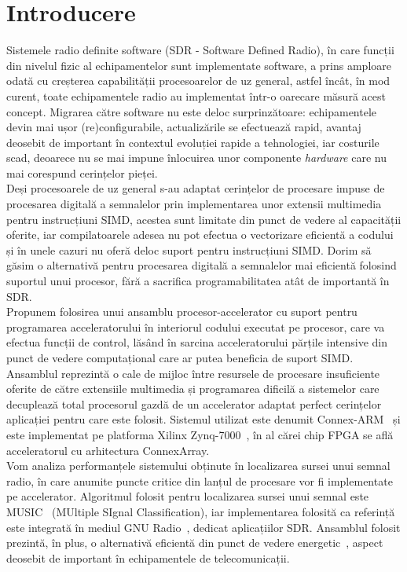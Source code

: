 \chapter{Introducere}
\label{chapter:intro}

Sistemele radio definite software (SDR - Software Defined Radio), în care
funcții din nivelul fizic al echipamentelor sunt implementate software, a prins
amploare odată cu creșterea capabilității procesoarelor de uz general, astfel
încât, în mod curent, toate echipamentele radio au implementat într-o oarecare
măsură acest concept. Migrarea către software nu este deloc surprinzătoare:
echipamentele devin mai ușor (re)configurabile, actualizările se efectuează rapid, avantaj
deosebit de important în contextul evoluției rapide a tehnologiei, iar costurile
scad, deoarece nu se mai impune înlocuirea unor componente \textit{hardware} care nu mai
corespund cerințelor pieței. \\

Deși procesoarele de uz general s-au adaptat cerințelor de procesare impuse de
procesarea digitală a semnalelor prin implementarea unor extensii multimedia
pentru instrucțiuni SIMD, acestea sunt limitate din punct de vedere al
capacității oferite, iar compilatoarele adesea nu pot efectua o vectorizare
eficientă a codului și în unele cazuri nu oferă deloc suport pentru instrucțiuni
SIMD. Dorim să găsim o alternativă pentru procesarea digitală a semnalelor mai
eficientă folosind suportul unui procesor, fără a sacrifica
programabilitatea atât de importantă în SDR. \\

Propunem folosirea unui ansamblu procesor-accelerator cu suport pentru
programarea acceleratorului în interiorul codului executat pe procesor, care va
efectua funcții de control, lăsând în sarcina acceleratorului părțile intensive
din punct de vedere computațional care ar putea beneficia de suport SIMD.
Ansamblul reprezintă o cale de mijloc între resursele de procesare insuficiente
oferite de către extensiile multimedia și programarea dificilă a sistemelor care
decuplează total procesorul gazdă de un accelerator adaptat perfect cerințelor
aplicației pentru care este folosit. Sistemul utilizat este denumit
Connex-ARM~\cite{energy-effective-simd} și este implementat pe platforma Xilinx
Zynq-7000~\cite{zynq}, în al cărei chip FPGA se află acceleratorul cu
arhitectura ConnexArray. \\

Vom analiza performanțele sistemului obținute în localizarea sursei unui semnal
radio, în care anumite puncte critice din lanțul de procesare vor fi
implementate pe accelerator. Algoritmul folosit pentru localizarea sursei unui
semnal este MUSIC~\cite{music-schmidt} (MUltiple SIgnal Classification), iar implementarea folosită
ca referință~\cite{ettus-doa} este integrată în mediul GNU
Radio~\cite{gnuradio}, dedicat aplicațiilor SDR. Ansamblul folosit prezintă, în
plus, o alternativă eficientă din punct de vedere energetic~\cite{fpga-visual},
aspect deosebit de important în echipamentele de telecomunicații.

